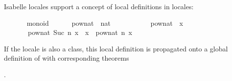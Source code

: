 \begin{isabellebody}
\isamarkuptrue%
%
\isamarkuptrue%
%
\begin{isamarkuptext}%
Isabelle locales support a concept of local definitions
  in locales:%
\end{isamarkuptext}%
\isamarkuptrue%
\ \ \ \ \isamarkupfalse%
\ {\isacharparenleft}\ monoid{\isacharparenright}\isanewline
\ \ \ \ \ \ pow{\isacharunderscore}nat\ {\isacharcolon}{\isacharcolon}\ {\isachardoublequoteopen}nat\ {\isasymRightarrow}\ {\isasymalpha}\ {\isasymRightarrow}\ {\isasymalpha}{\isachardoublequoteclose}\ \isanewline
\ \ \ \ \ \ {\isachardoublequoteopen}pow{\isacharunderscore}nat\ {}\ x\ {\isacharequal}\ {\isasymone}{\isachardoublequoteclose}\isanewline
\ \ \ \ \ \ {\isacharbar}\ {\isachardoublequoteopen}pow{\isacharunderscore}nat\ {\isacharparenleft}Suc\ n{\isacharparenright}\ x\ {\isacharequal}\ x\ {\isasymotimes}\ pow{\isacharunderscore}nat\ n\ x{\isachardoublequoteclose}%
\begin{isamarkuptext}%
\noindent If the locale  is also a class, this local
  definition is propagated onto a global definition of
  with corresponding theorems

  .


\end{isamarkuptext}
\end{isabellebody}
